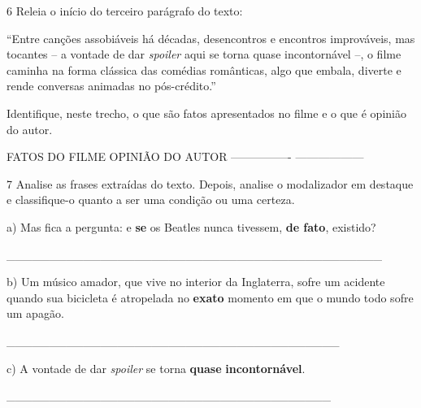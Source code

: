{\num{6} Releia o início do terceiro parágrafo do texto:

``Entre canções assobiáveis há décadas, desencontros e encontros
improváveis, mas tocantes -- a vontade de dar \emph{spoiler} aqui se
torna quase incontornável --, o filme caminha na forma clássica das
comédias românticas, algo que embala, diverte e rende conversas animadas
no pós-crédito.''

Identifique, neste trecho, o que são fatos apresentados no filme e o que
é opinião do autor.

FATOS DO FILME OPINIÃO DO AUTOR ---------------- ------------------


\num{7} Analise as frases extraídas do texto. Depois, analise o
modalizador em destaque e classifique-o quanto a ser uma condição ou uma
certeza.

a) Mas fica a pergunta: e \textbf{{se}} os Beatles nunca tivessem,
\textbf{{de fato}}, existido?

\_\_\_\_\_\_\_\_\_\_\_\_\_\_\_\_\_\_\_\_\_\_\_\_\_\_\_\_\_\_\_\_\_\_\_\_\_\_\_\_\_\_\_\_

b) Um músico amador, que vive no interior da Inglaterra, sofre um
acidente quando sua bicicleta é atropelada no \textbf{{exato}} momento
em que o mundo todo sofre um apagão.

\_\_\_\_\_\_\_\_\_\_\_\_\_\_\_\_\_\_\_\_\_\_\_\_\_\_\_\_\_\_\_\_\_\_\_\_\_\_\_

c) A vontade de dar \emph{spoiler} se torna \textbf{{quase}}
\textbf{{incontornável}}.

\_\_\_\_\_\_\_\_\_\_\_\_\_\_\_\_\_\_\_\_\_\_\_\_\_\_\_\_\_\_\_\_\_\_\_\_\_\_

}
